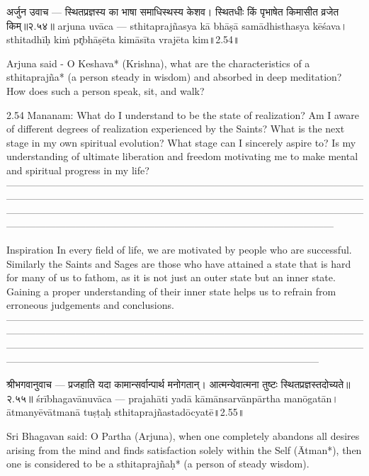 अर्जुन उवाच —
स्थितप्रज्ञस्य का भाषा समाधिस्थस्य केशव। 
स्थितधीः किं पृभाषेत किमासीत व्रजेत किम्॥२.५४॥
arjuna uvāca —
sthitaprajñasya kā bhāṣā samādhisthasya kēśava। 
sthitadhīḥ kiṁ pr̥bhāṣēta kimāsīta vrajēta kim॥2.54॥

Arjuna said -
O Keshava* (Krishna), what are the characteristics of a sthitaprajña* (a person steady in wisdom) and absorbed in deep meditation? How does such a person speak, sit, and walk? 

2.54 Mananam:
What do I understand to be the state of realization? Am I aware of different degrees of realization experienced by the Saints? What is the next stage in my own spiritual evolution? What stage can I sincerely aspire to? Is my understanding of ultimate liberation and freedom motivating me to make mental and spiritual progress in my life?
—------------------------------------------------------------------------------------------------------------------------------------------------------------------------------------------------------------------------------------------------------------------------------------------------------------------------------------------------------------------------------------------------------------------------------------

Inspiration
In every field of life, we are motivated by people who are successful. Similarly the Saints and Sages are those who have attained a state that is hard for many of us to fathom, as it is not just an outer state but an inner state. Gaining a proper understanding of their inner state helps us to refrain from erroneous judgements and conclusions.
—--------------------------------------------------------------------------------------------------------------------------------------------------------------------------------------------------------------------------------------------------------------------------------------------------------------------------------------------------------------------------------------------------------------------------------



श्रीभगवानुवाच —
प्रजहाति यदा कामान्सर्वान्पार्थ मनोगतान्। 
आत्मन्येवात्मना तुष्टः स्थितप्रज्ञस्तदोच्यते॥२.५५॥
śrībhagavānuvāca —
prajahāti yadā kāmānsarvānpārtha manōgatān। 
ātmanyēvātmanā tuṣṭaḥ sthitaprajñastadōcyatē॥2.55॥

Sri Bhagavan said:
O Partha (Arjuna), when one completely abandons all desires arising from the mind and finds satisfaction solely within the Self (Ātman*), then one is considered to be a sthitaprajñaḥ* (a person of steady wisdom). 

